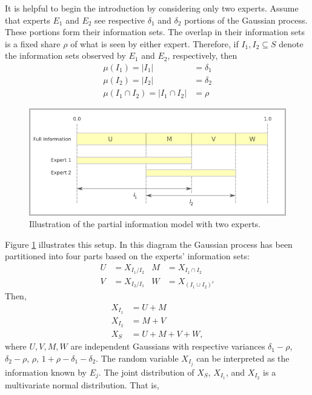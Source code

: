\documentclass[11pt,twoside]{article}
\theoremstyle{definition}
\theoremstyle{definition}
\begin{document}
It is helpful to begin the introduction by considering only two experts. Assume that experts $E_1$ and $E_2$ see respective $\delta_1$ and $\delta_2$ portions of the Gaussian process. These portions form their information sets. The overlap in their information sets is a fixed share $\rho$ of what is seen by either expert. Therefore, if $I_1, I_2 \subseteq S$ denote the information sets observed by $E_1$ and $E_2$, respectively, then
\begin{align*}
\mu(I_1) = |I_1| &= \delta_1\\
\mu(I_2) = |I_2| &= \delta_2\\
\mu(I_1 \cap I_2) =  |I_1 \cap I_2| &= \rho
\end{align*}
\begin{figure}[htbp]
   \includegraphics[width = \textwidth]{N=2} %
   \caption{Illustration of the partial information model with two experts.}
   \label{diagram2}
\end{figure}
Figure \ref{diagram2} illustrates this setup. In this diagram the Gaussian process has been partitioned into four parts based on the experts' information sets:
\begin{align*}
 U &= X_{I_1 / I_2}
& M &= X_{I_1 \cap I_2}\\
 V &= X_{I_2 / I_1}
& W &= X_{(I_1 \cup I_2)^c}
\end{align*}
Then,
\begin{align*}
X_{I_1} &= U + M\\
X_{I_2} &= M + V\\
X_S &= U+M+V+W,
\end{align*}
where $U, V, M, W$ are independent Gaussians with respective variances $\delta_1-\rho$, $\delta_2-\rho$, $\rho$, $1+\rho-\delta_1 - \delta_2$. The random variable $X_{I_j}$ can be interpreted as the information known by $E_j$. The joint distribution of $X_{S}$, $X_{I_1}$, and $X_{I_2}$ is a multivariate normal distribution. That is,
\end{document}
